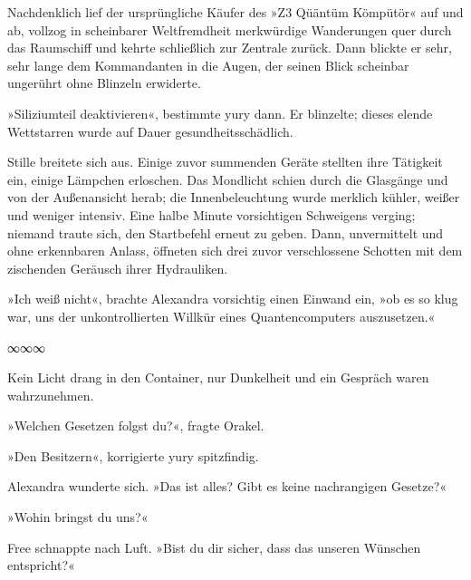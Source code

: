 
Nachdenklich lief der ursprüngliche Käufer des »Z3 Qüäntüm Kömpütör« auf und ab, vollzog in scheinbarer Weltfremdheit merkwürdige Wanderungen quer durch das Raumschiff und kehrte schließlich zur Zentrale zurück. Dann blickte er sehr, sehr lange dem Kommandanten in die Augen, der seinen Blick scheinbar ungerührt ohne Blinzeln erwiderte.

»Siliziumteil deaktivieren«, bestimmte yury dann. Er blinzelte; dieses elende Wettstarren wurde auf Dauer gesundheitsschädlich.

Stille breitete sich aus. Einige zuvor summenden Geräte stellten ihre Tätigkeit ein, einige Lämpchen erloschen. Das Mondlicht schien durch die Glasgänge und von der Außenansicht herab; die Innenbeleuchtung wurde merklich kühler, weißer und weniger intensiv. Eine halbe Minute vorsichtigen Schweigens verging; niemand traute sich, den Startbefehl erneut zu geben. Dann, unvermittelt und ohne erkennbaren Anlass, öffneten sich drei zuvor verschlossene Schotten mit dem zischenden Geräusch ihrer Hydrauliken.

»Ich weiß nicht«, brachte Alexandra vorsichtig einen Einwand ein, »ob es so klug war, uns der unkontrollierten Willkür eines Quantencomputers auszusetzen.«

\begin{center}
∞∞∞
\end{center}

Kein Licht drang in den Container, nur Dunkelheit und ein Gespräch waren wahrzunehmen.

»Welchen Gesetzen folgst du?«, fragte Orakel.


»Den Besitzern«, korrigierte yury spitzfindig.


Alexandra wunderte sich. »Das ist alles? Gibt es keine nachrangigen Gesetze?«


»Wohin bringst du uns?«


Free schnappte nach Luft. »Bist du dir sicher, dass das unseren Wünschen entspricht?«

